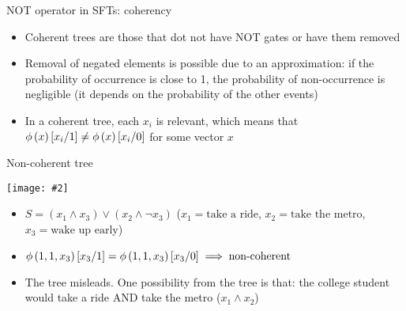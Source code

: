 \documentclass{beamer}
\newcommand{\includegraphicsaspectratio}[2][1]{%
  \texttt{[image: \#2]}%
}
\def\ftcoherencyop{\ensuremath\operatorname{\phi}}
\newcommand{\ftcoherency}[1]{\ensuremath\ftcoherencyop\left(#1\right)}
\newcommand{\replace}[2]{\ensuremath\left[#1\middle/#2\right]}
\begin{document}
\begin{frame}[label=not]{NOT operator in SFTs: coherency}
	\begin{itemize}
		\item Coherent trees are those that dot not have NOT gates or have them removed
		\item Removal of negated elements is possible due to an approximation: if the probability of occurrence is close to 1, the probability of non-occurrence is negligible (it depends on the probability of the other events)
		\item In a coherent tree, each $x_i$ is relevant, which means that $\ftcoherency{x}\replace{x_i}{1} \neq \ftcoherency{x}\replace{x_i}{0}$ for some vector $x$
	\end{itemize}
	\hyperlink{coherencydef}{}
\end{frame}

\begin{frame}{Non-coherent tree}
	\begin{center}
		\includegraphicsaspectratio[0.50]{non-coherent-ft-example}\\
	\end{center}
	\footnotesize
	\begin{itemize}
		\item $S = \left(x_1 \land x_3\right) \lor \left(x_2 \land \lnot x_3\right)$ ($x_1 = \text{take a ride}$, $x_2 = \text{take the metro}$, $x_3 = \text{wake up early}$)
		\item $\ftcoherency{1,1,x_3}\replace{x_3}{1}=\ftcoherency{1,1,x_3}\replace{x_3}{0} \implies \text{non-coherent}$
		\item The tree misleads. One possibility from the tree is that: the college student would take a ride AND take the metro ($x_1 \land x_2$)
	\end{itemize}
\end{frame}
\end{document}
